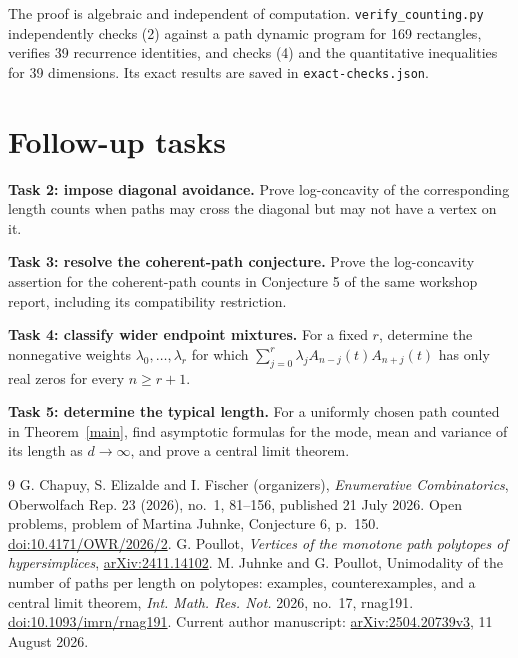 \documentclass[10pt]{article}
\begin{document}
The proof is algebraic and independent of computation.
\texttt{verify\_counting.py} independently checks (2) against a path
dynamic program for 169 rectangles, verifies 39 recurrence identities,
and checks (4) and the quantitative inequalities for 39 dimensions.
Its exact results are saved in \texttt{exact-checks.json}.

\section{Follow-up tasks}
\noindent\textbf{Task 2: impose diagonal avoidance.}
Prove log-concavity of the corresponding length counts when paths may
cross the diagonal but may not have a vertex on it.

\medskip
\noindent\textbf{Task 3: resolve the coherent-path conjecture.}
Prove the log-concavity assertion for the coherent-path counts in
Conjecture 5 of the same workshop report, including its compatibility
restriction.

\medskip
\noindent\textbf{Task 4: classify wider endpoint mixtures.}
For a fixed $r$, determine the nonnegative weights
$\lambda_0,\ldots,\lambda_r$ for which
$\sum_{j=0}^r\lambda_j A_{n-j}(t)A_{n+j}(t)$ has only real
zeros for every $n\ge r+1$.

\medskip
\noindent\textbf{Task 5: determine the typical length.}
For a uniformly chosen path counted in Theorem~\ref{main}, find
asymptotic formulas for the mode, mean and variance of its length
as $d\to\infty$, and prove a central limit theorem.

\begin{thebibliography}{9}
G. Chapuy, S. Elizalde and I. Fischer (organizers),
\emph{Enumerative Combinatorics}, Oberwolfach Rep. 23 (2026), no.~1,
81--156, published 21 July 2026.
Open problems, problem of Martina Juhnke, Conjecture 6, p.~150.
\href{https://doi.org/10.4171/OWR/2026/2}{doi:10.4171/OWR/2026/2}.
G. Poullot, \emph{Vertices of the monotone path polytopes of
hypersimplices}, \href{https://arxiv.org/abs/2411.14102}{arXiv:2411.14102}.
M. Juhnke and G. Poullot, Unimodality of the number of paths per length
on polytopes: examples, counterexamples, and a central limit theorem,
\emph{Int. Math. Res. Not.} 2026, no.~17, rnag191.
\href{https://doi.org/10.1093/imrn/rnag191}{doi:10.1093/imrn/rnag191}.
Current author manuscript:
\href{https://arxiv.org/abs/2504.20739v3}{arXiv:2504.20739v3},
11 August 2026.
\end{thebibliography}
\end{document}
